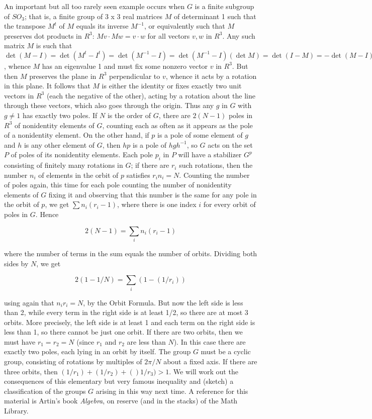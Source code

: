 \documentclass[10pt]{article}
\begin{document}
An important but all too rarely seen example occurs when $G$ is a finite
subgroup of $SO_3$; that is, a finite group of 3 x 3 real matrices $M$
of determinant 1 such that the transpose $M^t$ of $M$ equals its inverse
$M^{-1}$, or equivalently such that $M$ preserves dot products in $R^3$:
$Mv\cdot Mw = v\cdot w$ for all vectors $v,w$ in $R^3$. Any such matrix
$M$ is such that $\det (M- I) = \det (M^t - I^t) = \det (M^{-1} - I) =
\det (M^{-1} - I)(\det M) = \det (I - M) = -\det (M - I) = 0$, whence
$M$ has an eigenvalue 1 and must fix some nonzero vector $v$ in $R^3$.
But then $M$ preserves the plane in $R^3$ perpendicular to $v$, whence
it acts by a rotation in this plane. It follows that $M$ is either the
identity or fixes exactly two unit vectors in $R^3$ (each the negative
of the other), acting by a rotation about the line through these
vectors, which also goes through the origin. Thus any $g$ in $G$ with
$g\ne1$ has exactly two poles. If $N$ is the order of $G$, there are
$2(N-1)$ poles in $R^3$ of nonidentity elements of $G$, counting each as
often as it appears as the pole of a nonidentity element. On the other
hand, if $p$ is a pole of some element of $g$ and $h$ is any other
element of $G$, then $hp$ is a pole of $hgh^{-1}$, so $G$ acts on the
set $P$ of poles of its nonidentity elements. Each pole $p_i$ in $P$
will have a stabilizer $G^p$ consisting of finitely many rotations in
$G$; if there are $r_i$ such rotations, then the number $n_i$ of
elements in the orbit of $p$ satisfies $r_i n_i = N$. Counting the
number of poles again, this time for each pole counting the number of
nonidentity elements of $G$ fixing it and observing that this number is
the same for any pole in the orbit of $p$, we get $\sum n_i(r_i - 1)$,
where there is one index $i$ for every orbit of poles in $G$. Hence

\[
2 (N - 1) = \sum_i n_i(r_i - 1)
\]

where the number of terms in the sum equals the number of orbits.
Dividing both sides by $N$, we get

\[
2(1 - 1/N) = \sum_i (1- (1/r_i))
\]

using again that $n_i r_i = N$, by the Orbit Formula. But now the left
side is less than 2, while every term in the right side is at least 1/2,
so there are at most 3 orbits. More precisely, the left side is at least
1 and each term on the right side is less than 1, so there cannot be
just one orbit. If there are two orbits, then we must have $r_1 = r_2 =
N$ (since $r_1$ and $r_2$ are less than $N$). In this case there are
exactly two poles, each lying in an orbit by itself. The group $G$ must
be a cyclic group, consisting of rotations by multiples of $2\pi/N$
about a fixed axis. If there are three orbits, then
$(1/r_1)+(1/r_2)+()1/r_3) > 1.$ We will work out the consequences of
this elementary but very famous inequality and (sketch) a classification
of the groups $G$ arising in this way next time. A reference for this
material is Artin's book {\sl Algebra}, on reserve (and in the stacks)
of the Math Library.
\end{document}
